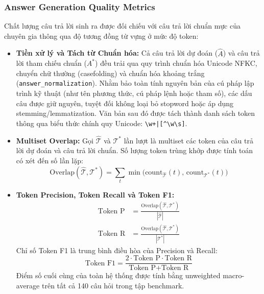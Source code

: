 \subsubsection{Answer Generation Quality Metrics}
Chất lượng câu trả lời sinh ra được đối chiếu với câu trả lời chuẩn mực của chuyên gia thông qua độ tương đồng từ vựng ở mức độ token:
\begin{itemize}
    \item \textbf{Tiền xử lý và Tách từ Chuẩn hóa:} Cả câu trả lời dự đoán ($\hat{A}$) và câu trả lời tham chiếu chuẩn ($A^*$) đều trải qua quy trình chuẩn hóa Unicode NFKC, chuyển chữ thường (casefolding) và chuẩn hóa khoảng trắng (\texttt{answer\_normalization}). Nhằm bảo toàn tính nguyên bản của cú pháp lập trình kỹ thuật (như tên phương thức, cú pháp lệnh hoặc tham số), các dấu câu được giữ nguyên, tuyệt đối không loại bỏ stopword hoặc áp dụng stemming/lemmatization. Văn bản sau đó được tách thành danh sách token thông qua biểu thức chính quy Unicode: \texttt{\textbackslash w+|[\textasciicircum\textbackslash w\textbackslash s]}.
    \item \textbf{Multiset Overlap:} Gọi $\hat{\mathcal{T}}$ và $\mathcal{T}^*$ lần lượt là multiset các token của câu trả lời dự đoán và câu trả lời chuẩn. Số lượng token trùng khớp được tính toán có xét đến số lần lặp:
    \begin{equation}
    \text{Overlap}(\hat{\mathcal{T}}, \mathcal{T}^*) = \sum_{t} \min\Big( \text{count}_{\hat{\mathcal{T}}}(t), \, \text{count}_{\mathcal{T}^*}(t) \Big)
    \label{eq:multiset_overlap}
    \end{equation}
    \item \textbf{Token Precision, Token Recall và Token F1:}
    \begin{align}
    \text{Token P} &= \frac{\text{Overlap}(\hat{\mathcal{T}}, \mathcal{T}^*)}{|\hat{\mathcal{T}}|} \label{eq:token_p} \\
    \text{Token R} &= \frac{\text{Overlap}(\hat{\mathcal{T}}, \mathcal{T}^*)}{|\mathcal{T}^*|} \label{eq:token_r}
    \end{align}
    Chỉ số Token F1 là trung bình điều hòa của Precision và Recall:
    \begin{equation}
    \text{Token F1} = \frac{2 \cdot \text{Token P} \cdot \text{Token R}}{\text{Token P} + \text{Token R}}
    \label{eq:token_f1}
    \end{equation}
    Điểm số cuối cùng của toàn hệ thống được tính bằng unweighted macro-average trên tất cả 140 câu hỏi trong tập benchmark.
\end{itemize}

